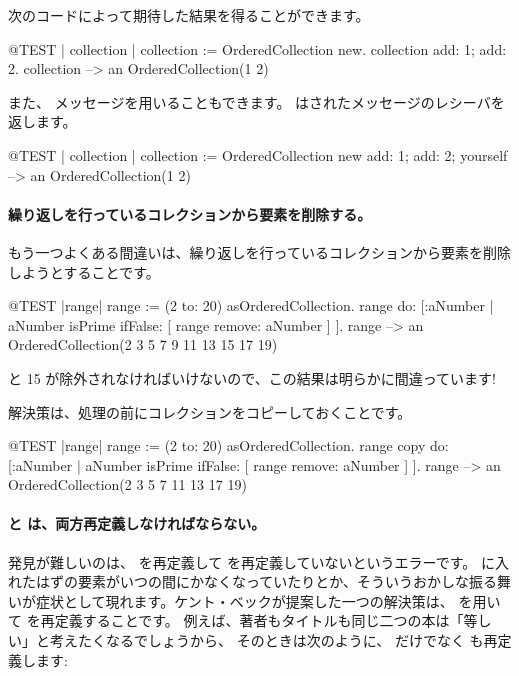 \documentclass[a4paper,10pt,twoside]{book}
\begin{document}
次のコードによって期待した結果を得ることができます。
\begin{code}{@TEST | collection |}
collection := OrderedCollection new.
collection add: 1; add: 2.
collection --> an OrderedCollection(1 2)
\end{code}

また、 メッセージを用いることもできます。 はされたメッセージのレシーバを返します。

\begin{code}{@TEST | collection |}
collection := OrderedCollection new add: 1; add: 2; yourself --> an OrderedCollection(1 2)
\end{code}

\paragraph{繰り返しを行っているコレクションから要素を削除する。} もう一つよくある間違いは、繰り返しを行っているコレクションから要素を削除しようとすることです。
\begin{code}{@TEST |range|}
range := (2 to: 20) asOrderedCollection.
range do: [:aNumber | aNumber isPrime ifFalse: [ range remove: aNumber ] ].
range --> an OrderedCollection(2 3 5 7 9 11 13 15 17 19)
\end{code}
 と 15 が除外されなければいけないので、この結果は明らかに間違っています!

解決策は、処理の前にコレクションをコピーしておくことです。
\begin{code}{@TEST |range|}
range := (2 to: 20) asOrderedCollection.
range copy do: [:aNumber | aNumber isPrime ifFalse: [ range remove: aNumber ] ].
range --> an OrderedCollection(2 3 5 7 11 13 17 19)
\end{code}

\paragraph{\ct{=} と  は、両方再定義しなければならない。}
発見が難しいのは、\ct{=} を再定義して を再定義していないというエラーです。 に入れたはずの要素がいつの間にかなくなっていたりとか、そういうおかしな振る舞いが症状として現れます。ケント・ベックが提案した一つの解決策は、 を用いて  を再定義することです。
例えば、著者もタイトルも同じ二つの本は「等しい」と考えたくなるでしょうから、
そのときは次のように、\ct{=} だけでなく  も再定義します:
\end{document}
